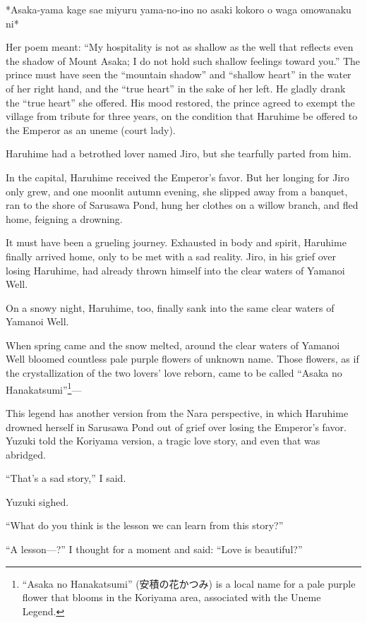 \documentclass[
    a4paper,
    12pt,
    twoside,
    openany,
    UTF8,
    fontset=windows
]{ctexbook}
\begin{document}
*Asaka-yama kage sae miyuru yama-no-ino no asaki kokoro o waga omowanaku ni*

Her poem meant: ``My hospitality is not as shallow as the well that reflects even the shadow of Mount Asaka; I do not hold such shallow feelings toward you.'' The prince must have seen the ``mountain shadow'' and ``shallow heart'' in the water of her right hand, and the ``true heart'' in the sake of her left. He gladly drank the ``true heart'' she offered. His mood restored, the prince agreed to exempt the village from tribute for three years, on the condition that Haruhime be offered to the Emperor as an uneme (court lady).

Haruhime had a betrothed lover named Jiro, but she tearfully parted from him.

In the capital, Haruhime received the Emperor's favor. But her longing for Jiro only grew, and one moonlit autumn evening, she slipped away from a banquet, ran to the shore of Sarusawa Pond, hung her clothes on a willow branch, and fled home, feigning a drowning.

It must have been a grueling journey. Exhausted in body and spirit, Haruhime finally arrived home, only to be met with a sad reality. Jiro, in his grief over losing Haruhime, had already thrown himself into the clear waters of Yamanoi Well.

On a snowy night, Haruhime, too, finally sank into the same clear waters of Yamanoi Well.

When spring came and the snow melted, around the clear waters of Yamanoi Well bloomed countless pale purple flowers of unknown name. Those flowers, as if the crystallization of the two lovers' love reborn, came to be called ``Asaka no Hanakatsumi''\footnote{``Asaka no Hanakatsumi'' (安積の花かつみ) is a local name for a pale purple flower that blooms in the Koriyama area, associated with the Uneme Legend.}---

This legend has another version from the Nara perspective, in which Haruhime drowned herself in Sarusawa Pond out of grief over losing the Emperor's favor. Yuzuki told the Koriyama version, a tragic love story, and even that was abridged.

``That's a sad story,'' I said.

Yuzuki sighed.

``What do you think is the lesson we can learn from this story?''

``A lesson---?'' I thought for a moment and said: ``Love is beautiful?''
\end{document}
